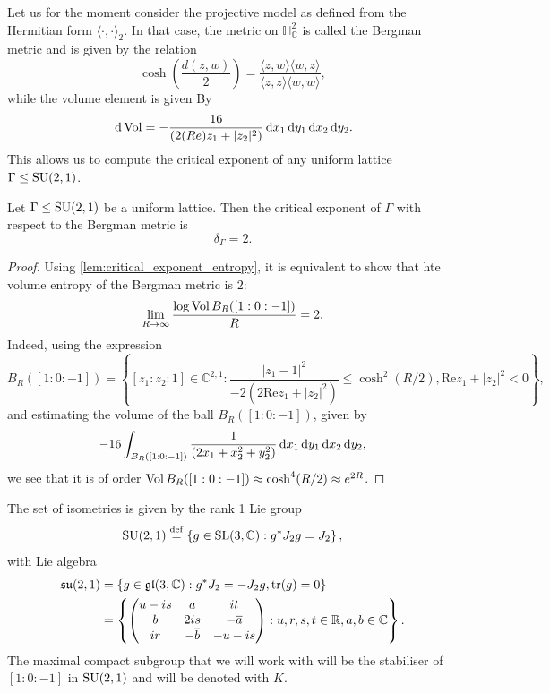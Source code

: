 \documentclass{report}
\begin{document}
Let us for the moment consider the projective model as defined from the Hermitian form $\langle \cdot, \cdot \rangle_2$.
In that case, the metric on $\mathbb H^2_{\mathbb C}$ is called the Bergman metric and is given by the relation
\[
\cosh\left(\frac{d(z,w)}{2}\right) = \frac{\langle z, w \rangle \langle w, z \rangle}{\langle z, z \rangle \langle w, w \rangle},
\]
while the volume element is given By
\[
\,\mathrm{d} \operatorname{Vol} = -\frac{16}{\left(2\mathrm(Re)z_1 + |z_2|^2\right)} \,\mathrm{d} x_1 \,\mathrm{d} y_1 \,\mathrm{d} x_2 \,\mathrm{d} y_2 .
\]
This allows us to compute the critical exponent of any uniform lattice $\Gamma \leq \operatorname{{\mathrm{SU}}}(2,1)$.
\begin{lemma}
    Let $\Gamma \leq \operatorname{{\mathrm{SU}}}(2,1)$ be a uniform lattice.
    Then the critical exponent of $\Gamma$ with respect to the Bergman metric is
    \[
    \delta_\Gamma = 2.
    \]
\end{lemma}
\begin{proof}
    Using \cref{lem:critical_exponent_entropy}, it is equivalent to show that hte volume entropy of the Bergman metric is $2$:
    \[
    \lim_{R \to \infty} \frac{\log \operatorname{Vol} B_R([1:0:-1])}{R}  = 2.
    \]
    Indeed, using the expression
    \[
    B_R([1:0:-1]) = \left\{ 
        [z_1: z_2: 1] \in \mathbb C^{2,1} : \frac{|z_1 - 1|^2}{-2(2\mathrm{Re}z_1 + |z_2|^2)} \leq \cosh^2(R/2), \mathrm{Re}z_1 + |z_2|^2 < 0
    \right\},
    \]
    and estimating the volume of the ball $B_R([1:0:-1])$, given by
    \[
    -16 \int_{B_R([1:0:-1])} \frac{1}{\left(2x_1 + x_2^2 + y_2^2\right)} \,\mathrm{d} x_1 \,\mathrm{d} y_1 \,\mathrm{d} x_2 \,\mathrm{d} y_2,
    \]
    we see that it is of order $\operatorname{Vol} B_R([1:0:-1]) \approx \cosh^4(R/2) \approx e^{2R}$.
\end{proof}
The set of isometries is given by the rank 1 Lie group
\[
\operatorname{{\mathrm{SU}}}(2,1) \overset{\mathrm{def}}{=} \left\{ g \in \operatorname{{\mathrm{SL}}}(3, \mathbb C) : g^* J_2 g = J_2 \right\},
\]
with Lie algebra
\begin{align*}
    \operatorname{{\mathfrak{su}}}(2,1) &= \left\{ g \in \operatorname{{\mathfrak{gl}}}(3, \mathbb C) : g^* J_2 = - J_2 g, \operatorname{tr}(g) = 0 \right\}\\
    &= \left\{ 
        \begin{pmatrix}
            u - is & a & it\\
            b & 2is & -\overline{a}\\
            ir & -\overline{b} & -u - is
        \end{pmatrix} : u,r,s,t \in \mathbb R, a, b \in \mathbb C
    \right\}.
\end{align*}
The maximal compact subgroup that we will work with will be the stabiliser of $[1:0:-1]$ in $\operatorname{{\mathrm{SU}}}(2,1)$ and will be denoted with $K$.
\end{document}
